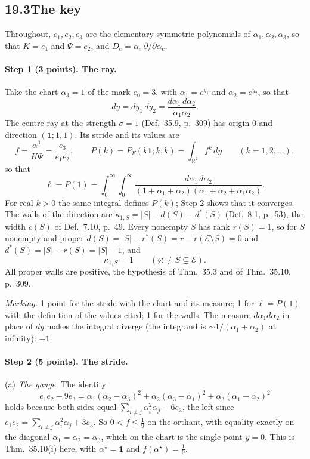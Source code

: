 \documentclass[11pt]{article}
\newcommand{\cE}{\mathcal E}
\newcommand{\one}{\mathbf 1}
\theoremstyle{plain}
\theoremstyle{definition}
\theoremstyle{remark}
\begin{document}
\subsection*{19.3\quad The key}

Throughout, $e_1,e_2,e_3$ are the elementary symmetric polynomials of $\alpha_1,\alpha_2,\alpha_3$, so that $K=e_1$ and $\Psi=e_2$, and $D_e=\alpha_e\,\partial/\partial\alpha_e$.

\paragraph{Step 1 (3 points). The ray.}
Take the chart $\alpha_3=1$ of the mark $e_0=3$, with $\alpha_1=e^{y_1}$ and $\alpha_2=e^{y_2}$, so that
\[
dy=dy_1\,dy_2=\frac{d\alpha_1\,d\alpha_2}{\alpha_1\alpha_2}.
\]
The centre ray at the strength $\sigma=1$ (Def.~35.9, p.~309) has origin $0$ and direction $(\one;1,1)$. Its stride and its values are
\[
f=\frac{\alpha^{\one}}{K\Psi}=\frac{e_3}{e_1e_2},\qquad P(k)=P_F(k\one;k,k)=\int_{\mathbb R^2}f^k\,dy\qquad(k=1,2,\dots),
\]
so that
\[
\ell=P(1)=\int_0^\infty\!\!\int_0^\infty\frac{d\alpha_1\,d\alpha_2}{(1+\alpha_1+\alpha_2)(\alpha_1+\alpha_2+\alpha_1\alpha_2)} .
\]
For real $k>0$ the same integral defines $P(k)$; Step 2 shows that it converges. The walls of the direction are $\kappa_{1,S}=|S|-d(S)-d^\ast(S)$ (Def.~8.1, p.~53), the width $c(S)$ of Def.~7.10, p.~49. Every nonempty $S$ has rank $r(S)=1$, so for $S$ nonempty and proper $d(S)=|S|-r^\ast(S)=r-r(\cE\setminus S)=0$ and $d^\ast(S)=|S|-r(S)=|S|-1$, and
\[
\kappa_{1,S}=1\qquad(\varnothing\neq S\subsetneq\cE).
\]
All proper walls are positive, the hypothesis of Thm.~35.3 and of Thm.~35.10, p.~309.

\smallskip\noindent\emph{Marking.} 1 point for the stride with the chart and its measure; 1 for $\ell=P(1)$ with the definition of the values cited; 1 for the walls. The measure $d\alpha_1d\alpha_2$ in place of $dy$ makes the integral diverge (the integrand is $\sim1/(\alpha_1+\alpha_2)$ at infinity): $-1$.

\paragraph{Step 2 (5 points). The stride.}
(a) \emph{The gauge.} The identity
\[
e_1e_2-9e_3=\alpha_1(\alpha_2-\alpha_3)^2+\alpha_2(\alpha_3-\alpha_1)^2+\alpha_3(\alpha_1-\alpha_2)^2
\]
holds because both sides equal $\sum_{i\neq j}\alpha_i^2\alpha_j-6e_3$, the left since $e_1e_2=\sum_{i\neq j}\alpha_i^2\alpha_j+3e_3$. So $0<f\le\frac19$ on the orthant, with equality exactly on the diagonal $\alpha_1=\alpha_2=\alpha_3$, which on the chart is the single point $y=0$. This is Thm.~35.10(i) here, with $\alpha^\star=\one$ and $f(\alpha^\star)=\frac19$.
\end{document}
